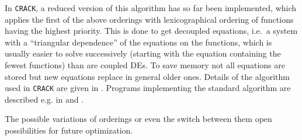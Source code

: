 In {\tt CRACK}, a reduced version of this algorithm has so far been
implemented, which applies the first of the above orderings with 
lexicographical ordering of functions having the highest
priority. This is done to get decoupled equations, i.e.\ a system with
a ``triangular dependence'' of the equations on the functions, 
which is usually easier to solve
successively (starting with the equation containing the fewest
functions) than are coupled DEs. To save memory not all equations
are stored but new equations replace in general older ones.
Details of the algorithm used
in {\tt CRACK} are given in \cite{Wo}.
Programs implementing the standard algorithm are described e.g. in
\cite{FS,Alex,Fush} and \cite{Reid1}.

The possible variations of orderings or even the switch between
them open possibilities for future optimization.

